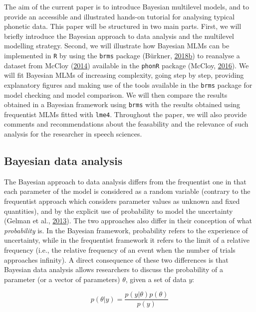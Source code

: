 \documentclass[a4paper,12pt,twoside,onecolumn,openright,final,oldfontcommands]{memoir}
\begin{document}
The aim of the current paper is to introduce Bayesian multilevel models, and to provide an accessible and illustrated hands-on tutorial for analysing typical phonetic data. This paper will be structured in two main parts. First, we will briefly introduce the Bayesian approach to data analysis and the multilevel modelling strategy. Second, we will illustrate how Bayesian MLMs can be implemented in \texttt{R} by using the \texttt{brms} package (Bürkner, \protect\hyperlink{ref-R-brms}{2018}\protect\hyperlink{ref-R-brms}{b}) to reanalyse a dataset from McCloy (\protect\hyperlink{ref-mccloy_phonetic_2014}{2014}) available in the \texttt{phonR} package (McCloy, \protect\hyperlink{ref-R-phonR}{2016}). We will fit Bayesian MLMs of increasing complexity, going step by step, providing explanatory figures and making use of the tools available in the \texttt{brms} package for model checking and model comparison. We will then compare the results obtained in a Bayesian framework using \texttt{brms} with the results obtained using frequentist MLMs fitted with \texttt{lme4}. Throughout the paper, we will also provide comments and recommendations about the feasability and the relevance of such analysis for the researcher in speech sciences.

\hypertarget{bayesian-data-analysis}{%
\subsection{Bayesian data analysis}\label{bayesian-data-analysis}}

The Bayesian approach to data analysis differs from the frequentist one in that each parameter of the model is considered as a random variable (contrary to the frequentist approach which considers parameter values as unknown and fixed quantities), and by the explicit use of probability to model the uncertainty (Gelman et al., \protect\hyperlink{ref-gelman_bayesian_2013}{2013}). The two approaches also differ in their conception of what \emph{probability} is. In the Bayesian framework, probability refers to the experience of uncertainty, while in the frequentist framework it refers to the limit of a relative frequency (i.e., the relative frequency of an event when the number of trials approaches infinity). A direct consequence of these two differences is that Bayesian data analysis allows researchers to discuss the probability of a parameter (or a vector of parameters) \(\theta\), given a set of data \(y\):

\[p(\theta|y) = \frac{p(y|\theta)p(\theta)}{p(y)}\]
\end{document}
